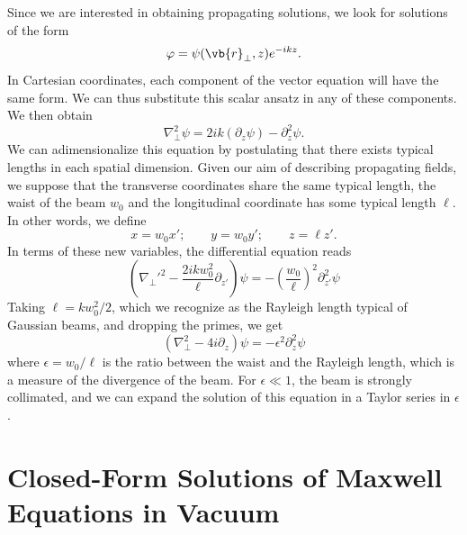\documentclass[11pt,SymmetricalJury]{inrsthesis/inrsthesis}
\begin{document}
Since we are interested in obtaining propagating solutions, we look for solutions
of the form
  \begin{equation}
    \varphi = \psi(\vb{r}_\perp,z)e^{-ikz}.
  \end{equation}
In Cartesian coordinates, each component of the vector equation will have the same
form. We can thus substitute this scalar ansatz in any of these components.
We then obtain
  \begin{equation}
    \nabla_\perp^2\psi=2ik(\partial_z\psi)-\partial_z^2\psi.
  \end{equation}
We can adimensionalize this equation by postulating that there exists typical
lengths in each spatial dimension. Given our aim of describing propagating
fields, we suppose that the transverse coordinates share the same typical
length, the waist of the beam $w_0$ and the longitudinal coordinate has some
typical length $\ell$. In other words, we define
  \begin{equation}
    x = w_0 x'; \qquad y = w_0 y'; \qquad z = \ell z'.
  \end{equation}
In terms of these new variables, the differential equation reads
  \begin{equation}
    \left({\nabla_\perp'}^2-\frac{2ikw_0^2}{\ell}\partial_{z'}\right)\psi = -\left(\frac{w_0}{\ell}\right)^2 \partial_{z'}^2 \psi
  \end{equation}
Taking $\ell=kw_0^2/2$, which we recognize as the Rayleigh length typical of Gaussian
beams, and dropping the primes, we get
  \begin{equation}
    \left(\nabla_\perp^2-4i\partial_z\right)\psi = -\epsilon^2\partial_z^2\psi
  \end{equation}
where $\epsilon=w_0/\ell$ is the ratio between the waist and the Rayleigh
length, which is a measure of the divergence of the beam. For $\epsilon\ll1$,
the beam is strongly collimated, and we can expand the solution of this
equation in a Taylor series in $\epsilon$.



\section{Closed-Form Solutions of Maxwell Equations in Vacuum}
\end{document}
